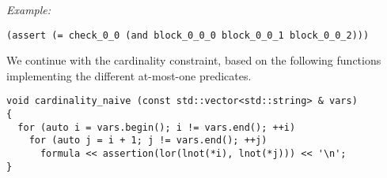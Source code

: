
\noindent
\emph{Example:} 

\begin{lstlisting}[style=smtlib]
(assert (= check_0_0 (and block_0_0_0 block_0_0_1 block_0_0_2)))
\end{lstlisting}


%
%

\noindent
We continue with the cardinality constraint, based on the following functions implementing the different at-most-one predicates.

\begin{lstlisting}[style=c++]
void cardinality_naive (const std::vector<std::string> & vars)
{
  for (auto i = vars.begin(); i != vars.end(); ++i)
    for (auto j = i + 1; j != vars.end(); ++j)
      formula << assertion(lor(lnot(*i), lnot(*j))) << '\n';
}
\end{lstlisting}


